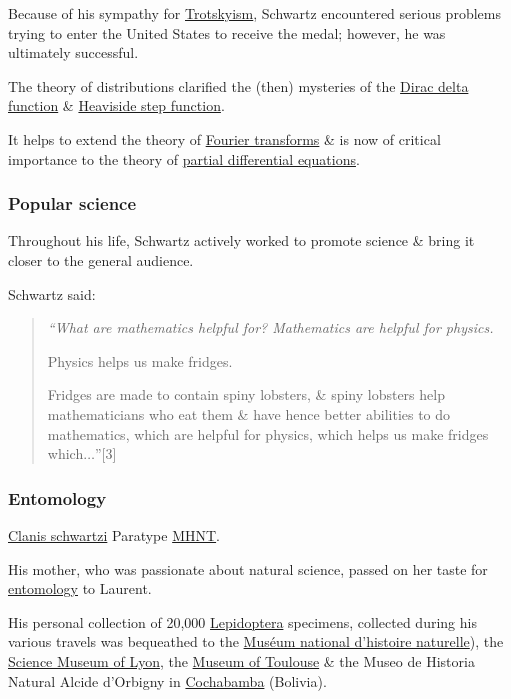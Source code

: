 \documentclass{article}
\begin{document}
Because of his sympathy for \href{https://en.wikipedia.org/wiki/Trotskyism}{Trotskyism}, Schwartz encountered serious problems trying to enter the United States to receive the medal; however, he was ultimately successful.

%
The theory of distributions clarified the (then) mysteries of the \href{https://en.wikipedia.org/wiki/Dirac_delta_function}{Dirac delta function} \& \href{https://en.wikipedia.org/wiki/Heaviside_step_function}{Heaviside step function}.

It helps to extend the theory of \href{https://en.wikipedia.org/wiki/Fourier_transform}{Fourier transforms} \& is now of critical importance to the theory of \href{https://en.wikipedia.org/wiki/Partial_differential_equation}{partial differential equations}.

\subsubsection{Popular science}
Throughout his life, Schwartz actively worked to promote science \& bring it closer to the general audience.

Schwartz said:
\begin{quotation}\it
	``What are mathematics helpful for? Mathematics are helpful for physics.
	
	Physics helps us make fridges.
	
	Fridges are made to contain spiny lobsters, \& spiny lobsters help mathematicians who eat them \& have hence better abilities to do mathematics, which are helpful for physics, which helps us make fridges which$\ldots$''[3]
\end{quotation}

\subsubsection{Entomology}
\textsf{\href{https://en.wikipedia.org/wiki/Clanis_schwartzi}{Clanis schwartzi} Paratype \href{https://en.wikipedia.org/wiki/MHNT}{MHNT}.}

His mother, who was passionate about natural science, passed on her taste for \href{https://en.wikipedia.org/wiki/Entomology}{entomology} to Laurent.

His personal collection of 20,000 \href{https://en.wikipedia.org/wiki/Lepidoptera}{Lepidoptera} specimens, collected during his various travels was bequeathed to the \href{https://en.wikipedia.org/wiki/National_Museum_of_Natural_History_(France)}{Muséum national d'histoire naturelle}), the \href{https://en.wikipedia.org/wiki/Mus%C3%A9e_des_Confluences}{Science Museum of Lyon}, the \href{https://en.wikipedia.org/wiki/Mus%C3%A9um_de_Toulouse}{Museum of Toulouse} \& the Museo de Historia Natural Alcide d'Orbigny in \href{https://en.wikipedia.org/wiki/Cochabamba}{Cochabamba} (Bolivia).
\end{document}
